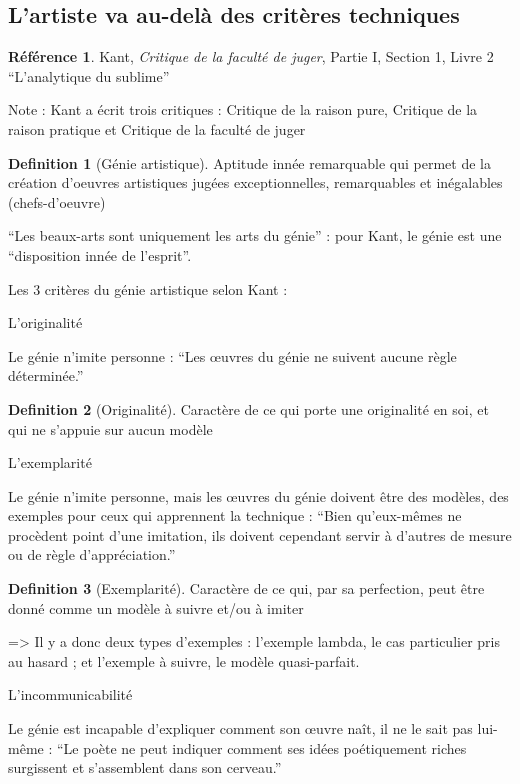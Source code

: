 \documentclass[french]{book}
\theoremstyle{definition}
\newtheorem*{dfn}{Definition}
\newtheorem*{refe}{Référence}
\begin{document}
\subsection{L’artiste va au-delà des critères techniques }

\begin{refe}
	Kant, \textit{Critique de la faculté de juger}, Partie I, Section 1, Livre 2 “L’analytique du sublime”
\end{refe}

Note : Kant a écrit trois critiques : Critique de la raison pure, Critique de la raison pratique et  Critique de la faculté de juger

\begin{dfn}[Génie artistique]
Aptitude innée remarquable qui permet de la création d’oeuvres artistiques jugées exceptionnelles, remarquables et inégalables (chefs-d’oeuvre)
\end{dfn}

“Les beaux-arts sont uniquement les arts du génie” : pour Kant, le génie est une “disposition innée de l’esprit”.

Les 3 critères du génie artistique selon Kant :

L’originalité

Le génie n’imite personne :
“Les œuvres du génie ne suivent aucune règle déterminée.”

\begin{dfn}[Originalité]
Caractère de ce qui porte une originalité en soi, et qui ne s'appuie sur aucun modèle 
\end{dfn}

L’exemplarité

Le génie n’imite personne, mais les œuvres du génie doivent être des modèles, des exemples pour ceux qui apprennent la technique :
“Bien qu’eux-mêmes ne procèdent point d’une imitation, ils doivent cependant servir à d’autres de mesure ou de règle d’appréciation.”

\begin{dfn}[Exemplarité]
Caractère de ce qui, par sa perfection, peut être donné comme un modèle à suivre et/ou à imiter
\end{dfn}

=> Il y a donc deux types d’exemples : l’exemple lambda, le cas particulier pris au hasard ; et l’exemple à suivre, le modèle quasi-parfait.

L’incommunicabilité

Le génie est incapable d’expliquer comment son œuvre naît, il ne le sait pas lui-même :
“Le poète ne peut indiquer comment ses idées poétiquement riches surgissent et s’assemblent dans son cerveau.”
\end{document}
